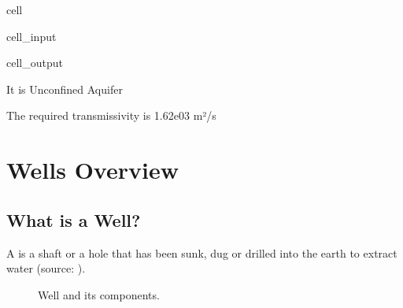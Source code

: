 \documentclass[letterpaper,10pt,english]{jupyterBook}
\begin{document}
\begin{sphinxuseclass}{cell}
\begin{sphinxVerbatimInput}
\begin{sphinxuseclass}{cell_input}
\begin{sphinxVerbatim}[commandchars=\\\{\}]
   

 
\end{sphinxVerbatim}

\end{sphinxuseclass}\end{sphinxVerbatimInput}
\begin{sphinxVerbatimOutput}

\begin{sphinxuseclass}{cell_output}
\begin{sphinxVerbatim}[commandchars=\\\{\}]
It is Unconfined Aquifer 

The required transmissivity is 1.62e\PYGZhy{}03 m²/s
\end{sphinxVerbatim}

\end{sphinxuseclass}\end{sphinxVerbatimOutput}

\end{sphinxuseclass}

\section{Wells \sphinxhyphen{} Overview}
\label{\detokenize{content/flow/L8/18_wells:wells-overview}}

\subsection{What is a Well?}
\label{\detokenize{content/flow/L8/18_wells:what-is-a-well}}
\sphinxAtStartPar
A  is a shaft or a hole that has been sunk, dug or drilled into the earth to extract water (source: ).

\begin{figure}[htbp]
\centering
\capstart

\noindent{}
\caption{Well and its components.}\label{\detokenize{content/flow/L8/18_wells:well}}\end{figure}
\end{document}
